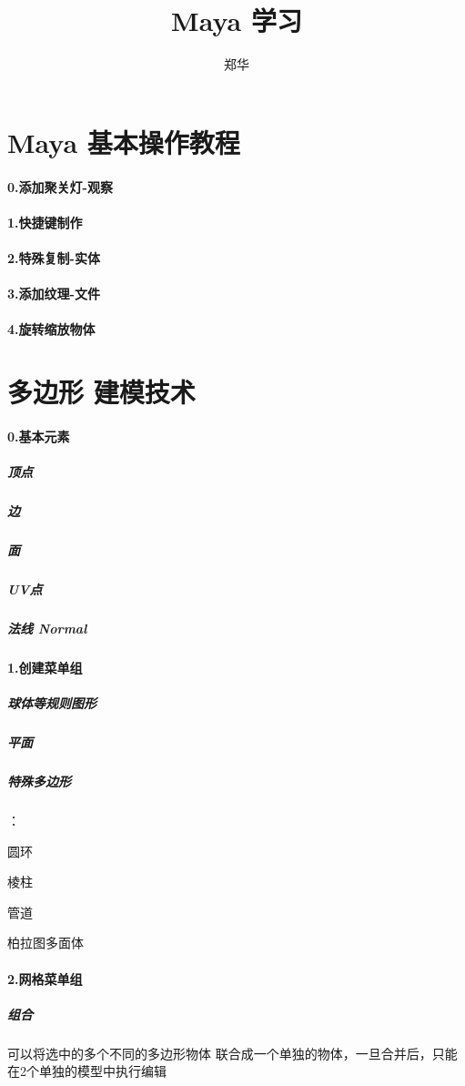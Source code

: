 \documentclass[UTF8,a4paper,8pt]{ctexart}
\author{郑华}
\title{Maya 学习}
\begin{document}
	\maketitle
	\newpage
	
\section{Maya 基本操作教程}
	\paragraph{0.添加聚关灯-观察}
	\paragraph{1.快捷键制作}
	\paragraph{2.特殊复制-实体}
	\paragraph{3.添加纹理-文件}
	\paragraph{4.旋转缩放物体}

\section{多边形 建模技术}	
	\paragraph{0.基本元素}
		\subparagraph{顶点}
		\subparagraph{边}
		\subparagraph{面}
		\subparagraph{UV点}
		\subparagraph{法线 Normal}
		
	\paragraph{1.创建菜单组}
		\subparagraph{球体等规则图形}
		\subparagraph{平面}
		\subparagraph{特殊多边形}：
		
		 圆环
		 
		 棱柱
		 
		 管道
		 
		 柏拉图多面体
	\paragraph{2.网格菜单组}
		\subparagraph{组合} 可以将选中的多个不同的多边形物体 联合成一个单独的物体，一旦合并后，只能在2个单独的模型中执行编辑
		
\end{document}
